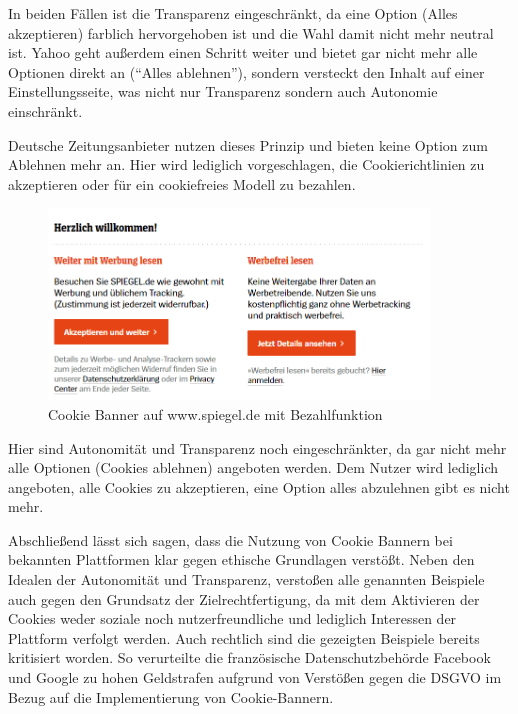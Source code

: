In beiden Fällen ist die Transparenz eingeschränkt, da eine Option (Alles akzeptieren) farblich hervorgehoben ist und die Wahl damit nicht mehr neutral ist. Yahoo geht außerdem einen Schritt weiter und bietet gar nicht mehr alle Optionen direkt an (``Alles ablehnen''), sondern versteckt den Inhalt auf einer Einstellungsseite, was nicht nur Transparenz sondern auch Autonomie einschränkt.

Deutsche Zeitungsanbieter nutzen dieses Prinzip und bieten keine Option zum Ablehnen mehr an. Hier wird lediglich vorgeschlagen, die Cookierichtlinien zu akzeptieren oder für ein cookiefreies Modell zu bezahlen.

\begin{figure}
    \centering
    \includegraphics[width=0.9\textwidth]{Bilder/Spiegel_Banner.png}
    \caption{Cookie Banner auf www.spiegel.de mit Bezahlfunktion}
    \label{fig:Spiegel-Cookie}
\end{figure}

Hier sind Autonomität und Transparenz noch eingeschränkter, da gar nicht mehr alle Optionen (Cookies ablehnen) angeboten werden. Dem Nutzer wird lediglich angeboten, alle Cookies zu akzeptieren, eine Option alles abzulehnen gibt es nicht mehr.

Abschließend lässt sich sagen, dass die Nutzung von Cookie Bannern bei bekannten Plattformen klar gegen ethische Grundlagen verstößt. Neben den Idealen der Autonomität und Transparenz, verstoßen alle genannten Beispiele auch gegen den Grundsatz der Zielrechtfertigung, da mit dem Aktivieren der Cookies weder soziale noch nutzerfreundliche und lediglich Interessen der Plattform verfolgt werden. Auch rechtlich sind die gezeigten Beispiele bereits kritisiert worden. So verurteilte die französische Datenschutzbehörde Facebook und Google zu hohen Geldstrafen aufgrund von Verstößen gegen die DSGVO im Bezug auf die Implementierung von Cookie-Bannern. 
